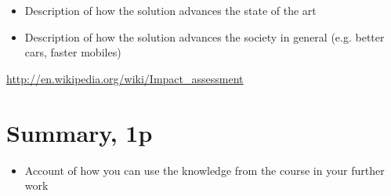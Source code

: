 \documentclass{article}
\begin{document}
\begin{itemize}
	\item Description of how the solution advances the state of the art
	\item Description of how the solution advances the society in general (e.g. better cars, faster mobiles)
\end{itemize}

\url{http://en.wikipedia.org/wiki/Impact_assessment}


\section{Summary, 1p}

\begin{itemize}
	\item Account of how you can use the knowledge from the course in your further work
\end{itemize}
\end{document}

